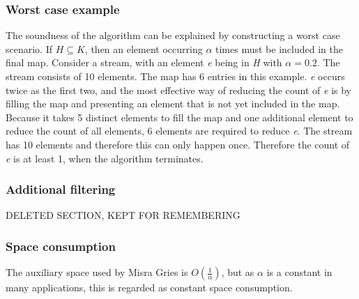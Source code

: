 \subsubsection{Worst case example}
The soundness of the algorithm can be explained by constructing a worst case scenario. If \(H \subseteq K\), then an element occurring \(\alpha\) times must be included in the final map. Consider a stream, with an element \textit{e} being in \textit{H} with \(\alpha = 0.2\). The stream consists of 10 elements. The map has 6 entries in this example. \textit{e} occurs twice as the first two, and the most effective way of reducing the count of \textit{e} is by filling the map and presenting an element that is not yet included in the map. Because it takes 5 distinct elements to fill the map and one additional element to reduce the count of all elements, 6 elements are required to reduce \textit{e}. The stream has 10 elements and therefore this can only happen once. Therefore the count of \textit{e} is at least 1, when the algorithm terminates.

\subsubsection{Additional filtering}
DELETED SECTION, KEPT FOR REMEMBERING

\subsubsection{Space consumption}
The auxiliary space used by Misra Gries is \(O\left(\frac{1}{\alpha}\right)\), but as \(\alpha\) is a constant in many applications, this is regarded as constant space consumption.
